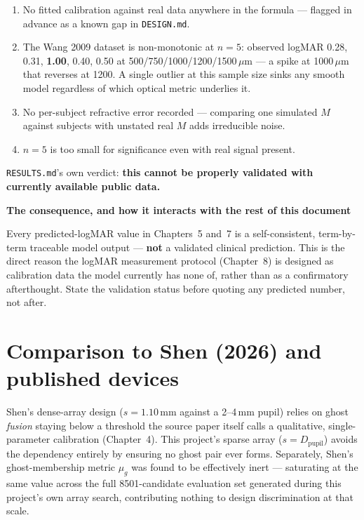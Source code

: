 \documentclass[11pt]{report}
\newenvironment{keybox}[1]%
{\par\vspace{6pt}\begin{lrbox}{\kbsave}\begin{minipage}{0.88\textwidth}%
{\bfseries\color{hbblue}#1}\par\vspace{4pt}\ignorespaces}%
{\end{minipage}\end{lrbox}%
\begin{center}\setlength{\fboxrule}{1.2pt}\setlength{\fboxsep}{7pt}%
\fcolorbox{hbblue}{boxgrey}{\usebox{\kbsave}}\end{center}\vspace{6pt}\par}
\begin{document}
\begin{enumerate}[leftmargin=1.2cm]
\item No fitted calibration against real data anywhere in the formula --- flagged in
advance as a known gap in \texttt{DESIGN.md}.
\item The Wang 2009 dataset is non-monotonic at $n=5$: observed logMAR 0.28, 0.31,
\textbf{1.00}, 0.40, 0.50 at 500/750/1000/1200/1500\,$\mu$m --- a spike at 1000\,$\mu$m
that reverses at 1200. A single outlier at this sample size sinks any smooth model
regardless of which optical metric underlies it.
\item No per-subject refractive error recorded --- comparing one simulated $M$ against
subjects with unstated real $M$ adds irreducible noise.
\item $n=5$ is too small for significance even with real signal present.
\end{enumerate}
\texttt{RESULTS.md}'s own verdict: \textbf{this cannot be properly validated with currently
available public data.}

\begin{keybox}{The consequence, and how it interacts with the rest of this document}
Every predicted-logMAR value in Chapters~5 and~7 is a self-consistent, term-by-term
traceable model output --- \textbf{not} a validated clinical prediction. This is the direct
reason the logMAR measurement protocol (Chapter~8) is designed as calibration data the
model currently has none of, rather than as a confirmatory afterthought. State the
validation status before quoting any predicted number, not after.
\end{keybox}

\section{Comparison to Shen (2026) and published devices}

Shen's dense-array design ($s=1.10$\,mm against a 2--4\,mm pupil) relies on ghost
\emph{fusion} staying below a threshold the source paper itself calls a qualitative,
single-parameter calibration (Chapter~4). This project's sparse array ($s=D_{\text{pupil}}$)
avoids the dependency entirely by ensuring no ghost pair ever forms. Separately, Shen's
ghost-membership metric $\mu_g$ was found to be effectively inert --- saturating at the
same value across the full 8501-candidate evaluation set generated during this project's
own array search, contributing nothing to design discrimination at that scale.
\end{document}
